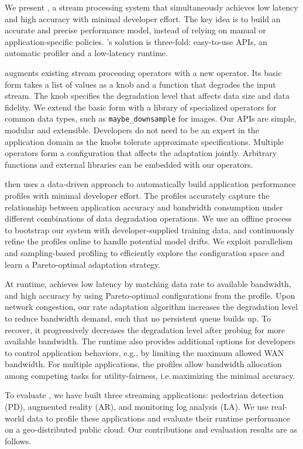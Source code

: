 We present \sysname{}, a stream processing system that
simultaneously achieves low latency and high accuracy with minimal developer
effort. The key idea is to build an accurate and precise performance model,
instead of relying on manual or application-specific policies. \sysname{}'s
solution is three-fold: easy-to-use APIs, an automatic profiler and a
low-latency runtime.

\sysname{} augments existing stream processing operators with a new \maybe{}
operator. Its basic form takes a list of values as a knob and a function that
degrades the input stream. The knob specifies the degradation level that affects
data size and data fidelity. We extend the basic form with a library of
specialized operators for common data types, such as \texttt{maybe\_downsample}
for images. Our APIs are simple, modular and extensible. Developers do not need
to be an expert in the application domain as the knobs tolerate approximate
specifications. Multiple operators form a configuration that affects the
adaptation jointly. Arbitrary functions and external libraries can be embedded
with our operators.

\sysname{} then uses a data-driven approach to automatically build application
performance profiles with minimal developer effort. The profiles accurately
capture the relationship between application accuracy and bandwidth consumption
under different combinations of data degradation operations. We use an offline
process to bootstrap our system with developer-supplied training data, and
continuously refine the profiles online to handle potential model drifts. We
exploit parallelism and sampling-based profiling to efficiently explore the
configuration space and learn a Pareto-optimal adaptation strategy.

At runtime, \sysname{} achieves low latency by matching data rate to available
bandwidth, and high accuracy by using Pareto-optimal configurations from the
profile. Upon network congestion, our rate adaptation algorithm increases the
degradation level to reduce bandwidth demand, such that no persistent queue
builds up. To recover, it progressively decreases the degradation level after
probing for more available bandwidth. The runtime also provides additional
options for developers to control application behaviors, e.g., by limiting the
maximum allowed WAN bandwidth. For multiple applications, the
profiles allow bandwidth allocation among competing tasks for utility-fairness,
i.e.\,maximizing the minimal accuracy.

To evaluate \sysname{}, we have built three streaming applications: pedestrian
detection (PD), augmented reality (AR), and monitoring log analysis (LA). We use
real-world data to profile these applications and evaluate their runtime
performance on a geo-distributed public cloud. Our contributions and
evaluation results are as follows.

